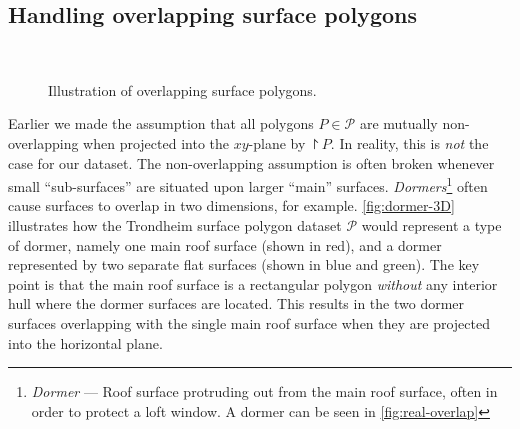 \subsection{Handling overlapping surface polygons}%
\label{sec:overlapping-fix}

\begin{figure}
  \centering
  \hspace{3em}
  \\\vspace{1em}
  \hspace{3em}
  \caption{%
    Illustration of overlapping surface polygons.
  }
  \label{fig:overlapping-polygons}
\end{figure}
Earlier we made the assumption that all polygons $P \in \mathcal{P}$ are mutually non-\linebreak overlapping when projected into the $xy$-plane by $\project{P}$.
In reality, this is \emph{not} the case for our dataset.
The non-overlapping assumption is often broken whenever small \enquote{sub-surfaces} are situated upon larger \enquote{main} surfaces.
\textit{Dormers}\footnote{\textit{Dormer} --- Roof surface protruding out from the main roof surface, often in order to protect a loft window. A dormer can be seen in \cref{fig:real-overlap}} often cause surfaces to overlap in two dimensions, for example.
\cref{fig:dormer-3D} illustrates how the Trondheim surface polygon dataset $\mathcal{P}$ would represent a type of dormer, namely one main roof surface (shown in \textcolor{red!80}{red}), and a dormer represented by two separate flat surfaces (shown in \textcolor{blue!80}{blue} and \textcolor{green!80}{green}).
The key point is that the main roof surface is a rectangular polygon \emph{without} any interior hull where the dormer surfaces are located.
This results in the two dormer surfaces overlapping with the single main roof surface when they are projected into the horizontal plane.
